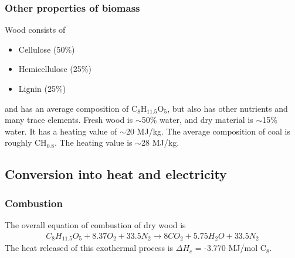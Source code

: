 \documentclass[a4paper,10pt]{article}
\begin{document}
\subsubsection{Other properties of biomass}
Wood consists of 
\begin{itemize}
 \item Cellulose (50\%)
 \item Hemicellulose (25\%)
 \item Lignin (25\%)
\end{itemize}
and has an average composition of C$_8$H$_{11.5}$O$_5$, but also has other nutrients and many trace elements. Fresh wood is $\sim$50\% water, and dry material is $\sim$15\% water. It has a heating value of $\sim$20 MJ/kg. The average composition of coal is roughly CH$_{0.8}$. The heating value is $\sim$28 MJ/kg. 

\subsection{Conversion into heat and electricity}
\subsubsection{Combustion}
The overall equation of combustion of dry wood is 
\begin{align}
 C_8H_{11.5}O_5 + 8.37O_2 + 33.5N_2 \rightarrow 8 CO_2 + 5.75H_2O + 33.5N_2
\end{align}
The heat released of this exothermal process is $\Delta H_c$ = -3.770 MJ/mol C$_8$. 
\end{document}
